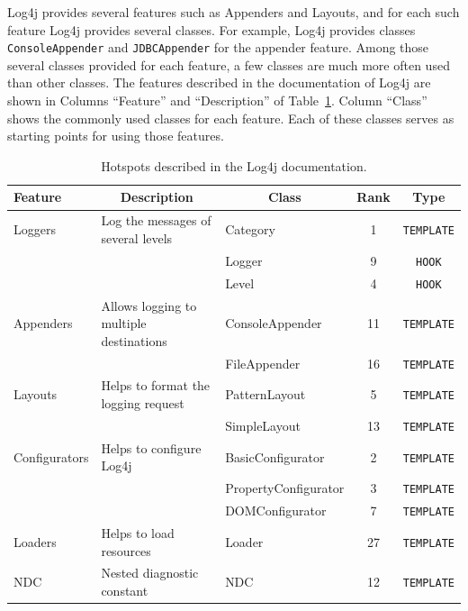\documentclass[conference]{IEEEtran}
\newcommand{\CodeIn}[1]{{\small\texttt{#1}}}
\newenvironment{CodeOut}{\begin{small}}{\end{small}}
\newcommand{\CenterCell}[1]{\multicolumn{1}{c|}{#1}}
\begin{document}
Log4j provides several features such as Appenders and Layouts, and
for each such feature Log4j provides several classes. For example, Log4j
provides classes \CodeIn{ConsoleAppender} and \CodeIn{JDBCAppender} for the appender feature.
Among those several classes provided for each feature, a few classes are
much more often used than other classes. The features described in the documentation of Log4j are shown in
Columns ``Feature'' and ``Description'' of Table~\ref{tab:hdresults}. Column
``Class'' shows the commonly used classes for each feature. Each of these
classes serves as starting points for using those features.

\setlength{\tabcolsep}{1pt}
\begin{table}[t]
\begin{CodeOut}
\begin{center}
\centering \caption {\label{tab:hdresults} Hotspots described in the Log4j documentation.}
\begin {tabular} {|l|l|l|c|c|}
\hline
Feature&\CenterCell{Description}&\CenterCell{Class}&Rank&Type\\
\hline Loggers&Log the messages of several levels&Category&1&\CodeIn{TEMPLATE}\\
\hline &&Logger&9&\CodeIn{HOOK}\\
\hline &&Level&4&\CodeIn{HOOK}\\
\hline Appenders&Allows logging to multiple destinations&ConsoleAppender&11&\CodeIn{TEMPLATE}\\
\hline &&FileAppender&16&\CodeIn{TEMPLATE}\\
\hline Layouts&Helps to format the logging request&PatternLayout&5&\CodeIn{TEMPLATE}\\
\hline &&SimpleLayout&13&\CodeIn{TEMPLATE}\\
\hline Configurators&Helps to configure Log4j&BasicConfigurator&2&\CodeIn{TEMPLATE}\\
\hline &&PropertyConfigurator&3&\CodeIn{TEMPLATE}\\
\hline &&DOMConfigurator&7&\CodeIn{TEMPLATE}\\
\hline Loaders&Helps to load resources&Loader&27&\CodeIn{TEMPLATE}\\
\hline NDC&Nested diagnostic constant&NDC&12&\CodeIn{TEMPLATE}\\
\hline
\end{tabular}
\end{center}
\end{CodeOut}
\end{table}
\end{document}
